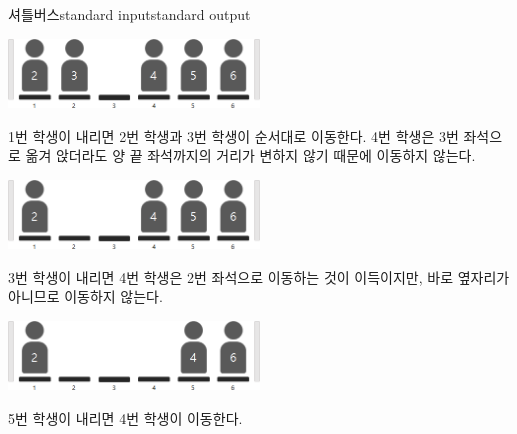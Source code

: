 \begin{problem}{셔틀버스}{standard input}{standard output}
\Example

\begin{example}
%
\end{example}

\Notes

\begin{center}
  \includegraphics[width=0.5\textwidth]{bus2.png}
\end{center}
1번 학생이 내리면 2번 학생과 3번 학생이 순서대로 이동한다. 4번 학생은 3번 좌석으로 옮겨 앉더라도 양 끝 좌석까지의 거리가 변하지 않기 때문에 이동하지 않는다.

\begin{center}
  \includegraphics[width=0.5\textwidth]{bus3.png}
\end{center}
3번 학생이 내리면 4번 학생은 2번 좌석으로 이동하는 것이 이득이지만, 바로 옆자리가 아니므로 이동하지 않는다.

\begin{center}
  \includegraphics[width=0.5\textwidth]{bus4.png}
\end{center}
5번 학생이 내리면 4번 학생이 이동한다.

\end{problem}
